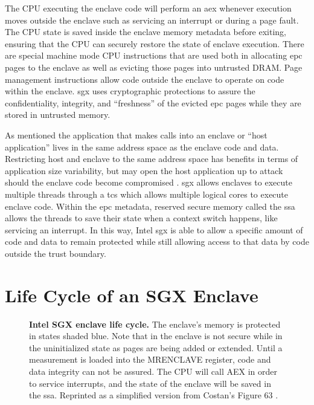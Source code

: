 The CPU executing the enclave code will perform an \gls{aex} whenever execution moves outside the enclave such as servicing an interrupt or during a page fault. The CPU state is saved inside the enclave memory metadata before exiting, ensuring that the CPU can securely restore the state of enclave execution. There are special machine mode CPU instructions that are used both in allocating \gls{epc} pages to the enclave as well as evicting those pages into untrusted DRAM. Page management instructions allow code outside the enclave to operate on code within the enclave. \gls{sgx} uses cryptographic protections to assure the confidentiality, integrity, and ``freshness'' \cite{Costan2016} of the evicted \gls{epc} pages while they are stored in untrusted memory. 

As mentioned the application that makes calls into an enclave or ``host application'' lives in the same address space as the enclave code and data. Restricting host and enclave to the same address space has benefits in terms of application size variability, but may open the host application up to attack should the enclave code become compromised \cite{schwarz2019practical}.  \gls{sgx} allows enclaves to execute multiple threads through a \gls{tcs} which allows multiple logical cores to execute enclave code. Within the \gls{epc} metadata, reserved secure memory called the \gls{ssa} allows the threads to save their state when a context switch happens, like servicing an interrupt. In this way, Intel \gls{sgx} is able to allow a specific amount of code and data to remain protected while still allowing access to that data by code outside the trust boundary.

\section{Life Cycle of an SGX Enclave}

\begin{figure}[ht]
\makebox[\textwidth][c]{}
\caption[Intel SGX Enclave Lifecycle]{\textbf{Intel SGX enclave life cycle.} The enclave's memory is protected in states shaded blue. Note that in the enclave is not secure while in the uninitialized state as pages are being added or extended. Until a measurement is loaded into the MRENCLAVE register, code and data integrity can not be assured. The CPU will call AEX in order to service interrupts, and the state of the enclave will be saved in the \gls{ssa}. Reprinted as a simplified version from Costan's Figure 63 \cite{Costan2016}.\label{figure:sgx-enclave-life-cycle}}
\end{figure}


